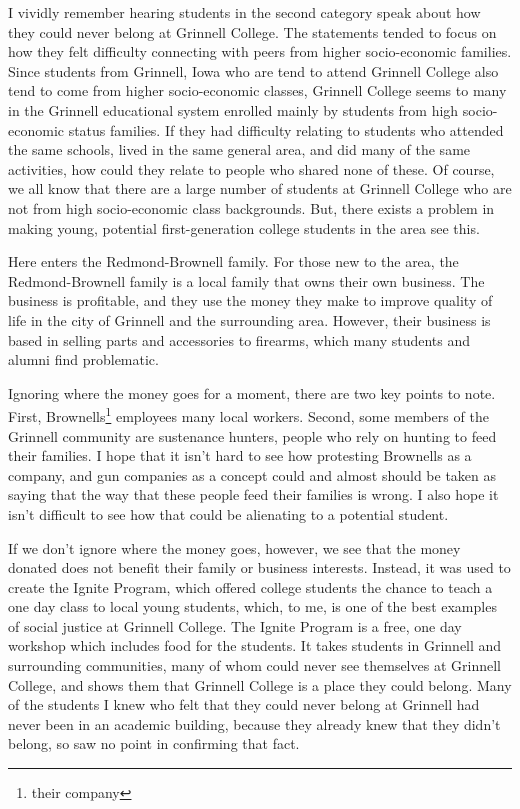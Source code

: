 \documentclass[12pt]{article}[titlepage]
\newcommand{\1}{\={a}}
\newcommand{\2}{\={e}}
\newcommand{\3}{\={\i}}
\newcommand{\4}{\=o}
\newcommand{\5}{\=u}
\newcommand{\6}{\={A}}
\renewcommand{\,}{\textsuperscript{,}}
\begin{document}
I vividly remember hearing students in the second category speak about how they could never belong at Grinnell College.
The statements tended to focus on how they felt difficulty connecting with peers from higher socio-economic families.
Since students from Grinnell, Iowa who are tend to attend Grinnell College also tend to come from higher socio-economic classes, Grinnell College seems to many in the Grinnell educational system enrolled mainly by students from high socio-economic status families.
If they had difficulty relating to students who attended the same schools, lived in the same general area, and did many of the same activities, how could they relate to people who shared none of these.
Of course, we all know that there are a large number of students at Grinnell College who are not from high socio-economic class backgrounds.
But, there exists a problem in making young, potential first-generation college students in the area see this.

Here enters the Redmond-Brownell family.
For those new to the area, the Redmond-Brownell family is a local family that owns their own business.
The business is profitable, and they use the money they make to improve quality of life in the city of Grinnell and the surrounding area.
However, their business is based in selling parts and accessories to firearms, which many students and alumni find problematic.

Ignoring where the money goes for a moment, there are two key points to note.
First, Brownells\footnote{their company} employees many local workers.
Second, some members of the Grinnell community are sustenance hunters, people who rely on hunting to feed their families.
I hope that it isn't hard to see how protesting Brownells as a company, and gun companies as a concept could and almost should be taken as saying that the way that these people feed their families is wrong.
I also hope it isn't difficult to see how that could be alienating to a potential student.

If we don't ignore where the money goes, however, we see that the money donated does not benefit their family or business interests.
Instead, it was used to create the Ignite Program, which offered college students the chance to teach a one day class to local young students, which, to me, is one of the best examples of social justice at Grinnell College.
The Ignite Program is a free, one day workshop which includes food for the students.
It takes students in Grinnell and surrounding communities, many of whom could never see themselves at Grinnell College, and shows them that Grinnell College is a place they could belong.
Many of the students I knew who felt that they could never belong at Grinnell had never been in an academic building, because they already knew that they didn't belong, so saw no point in confirming that fact.
\end{document}
